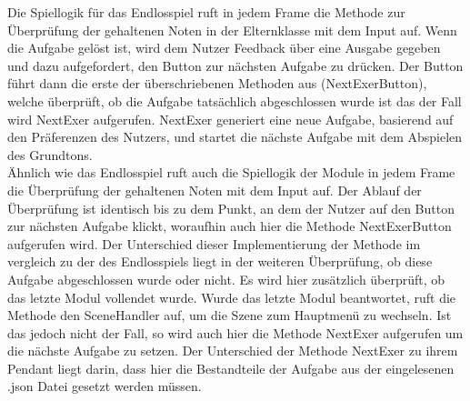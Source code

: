 Die Spiellogik für das Endlosspiel ruft in jedem Frame die Methode zur Überprüfung der gehaltenen Noten in der Elternklasse mit dem Input auf. Wenn die Aufgabe gelöst ist, wird dem Nutzer Feedback über eine Ausgabe gegeben und dazu aufgefordert, den Button zur nächsten Aufgabe zu drücken. Der Button führt dann die erste der überschriebenen Methoden aus (NextExerButton), welche überprüft, ob die Aufgabe tatsächlich abgeschlossen wurde ist das der Fall wird NextExer aufgerufen. NextExer generiert eine neue Aufgabe, basierend auf den Präferenzen des Nutzers, und startet die nächste Aufgabe mit dem Abspielen des Grundtons. \\
Ähnlich wie das Endlosspiel ruft auch die Spiellogik der Module in jedem Frame die Überprüfung der gehaltenen Noten mit dem Input auf. Der Ablauf der Überprüfung ist identisch bis zu dem Punkt, an dem der Nutzer auf den Button zur nächsten Aufgabe klickt, woraufhin auch hier die Methode NextExerButton aufgerufen wird. Der Unterschied dieser Implementierung der Methode im vergleich zu der des Endlosspiels liegt in der weiteren Überprüfung, ob diese Aufgabe abgeschlossen wurde oder nicht. Es wird hier zusätzlich überprüft, ob das letzte Modul vollendet wurde. Wurde das letzte Modul beantwortet, ruft die Methode den SceneHandler auf, um die Szene zum Hauptmenü zu wechseln. Ist das jedoch nicht der Fall, so wird auch hier die Methode NextExer aufgerufen um die nächste Aufgabe zu setzen. Der Unterschied der Methode NextExer zu ihrem Pendant liegt darin, dass hier die Bestandteile der Aufgabe aus der eingelesenen .json Datei gesetzt werden müssen. 

